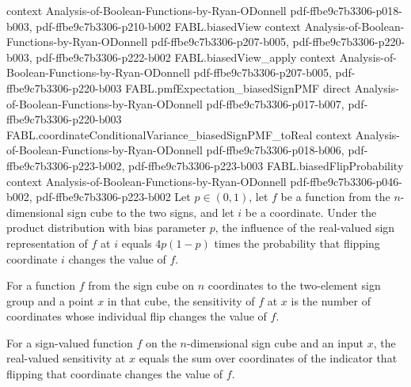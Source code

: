 \begin{theorem}
  {context}
  {Analysis-of-Boolean-Functions-by-Ryan-ODonnell}
  {pdf-ffbe9c7b3306-p018-b003,
    pdf-ffbe9c7b3306-p210-b002}
\proofstep
  {FABL.biasedView}
  {context}
  {Analysis-of-Boolean-Functions-by-Ryan-ODonnell}
  {pdf-ffbe9c7b3306-p207-b005,
    pdf-ffbe9c7b3306-p220-b003,
    pdf-ffbe9c7b3306-p222-b002}
\proofstep
  {FABL.biasedView_apply}
  {context}
  {Analysis-of-Boolean-Functions-by-Ryan-ODonnell}
  {pdf-ffbe9c7b3306-p207-b005,
    pdf-ffbe9c7b3306-p220-b003}
\proofstep
  {FABL.pmfExpectation_biasedSignPMF}
  {direct}
  {Analysis-of-Boolean-Functions-by-Ryan-ODonnell}
  {pdf-ffbe9c7b3306-p017-b007,
    pdf-ffbe9c7b3306-p220-b003}
\proofstep
  {FABL.coordinateConditionalVariance_biasedSignPMF_toReal}
  {context}
  {Analysis-of-Boolean-Functions-by-Ryan-ODonnell}
  {pdf-ffbe9c7b3306-p018-b006,
    pdf-ffbe9c7b3306-p223-b002,
    pdf-ffbe9c7b3306-p223-b003}
\proofstep
  {FABL.biasedFlipProbability}
  {context}
  {Analysis-of-Boolean-Functions-by-Ryan-ODonnell}
  {pdf-ffbe9c7b3306-p046-b002,
    pdf-ffbe9c7b3306-p223-b002}
Let $p\in(0,1)$, let $f$ be a function from the $n$-dimensional sign cube to the two
signs, and let $i$ be a coordinate. Under the product distribution with bias parameter
$p$, the influence of the real-valued sign representation of $f$ at $i$ equals $4p(1-p)$
times the probability that flipping coordinate $i$ changes the value of $f$.
\end{theorem}

\begin{definition}
\label{FABL.biasedSensitivity}
\leanok
{}
For a function $f$ from the sign cube on $n$ coordinates to the two-element sign group
and a point $x$ in that cube, the sensitivity of $f$ at $x$ is the number of coordinates
whose individual flip changes the value of $f$.
\end{definition}

\begin{theorem}
\label{FABL.biasedSensitivity_cast}
\leanok
{}
For a sign-valued function $f$ on the $n$-dimensional sign cube and an input $x$, the
real-valued sensitivity at $x$ equals the sum over coordinates of the indicator that
flipping that coordinate changes the value of $f$.
\end{theorem}

